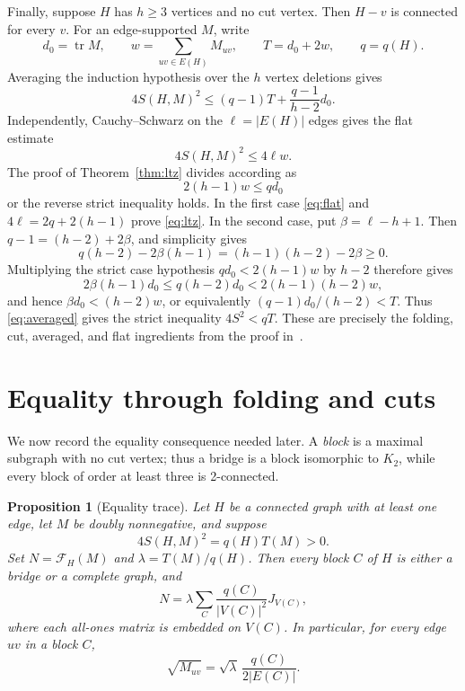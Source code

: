 \documentclass[11pt]{article}
\newtheorem{proposition}[theorem]{Proposition}
\theoremstyle{remark}
\newcommand{\tr}{\operatorname{tr}}
\begin{document}
Finally, suppose $H$ has $h\geq3$ vertices and no cut vertex.  Then $H-v$ is
connected for every $v$.  For an edge-supported $M$, write
\[
 d_0=\tr M,
 \qquad w=\sum_{uv\in E(H)}M_{uv},
 \qquad T=d_0+2w,
 \qquad q=q(H).
\]
Averaging the induction hypothesis over the $h$ vertex deletions gives
\begin{equation}\label{eq:averaged}
 4S(H,M)^2\leq(q-1)T+\frac{q-1}{h-2}d_0.
\end{equation}
Independently, Cauchy--Schwarz on the $\ell=|E(H)|$ edges gives the flat
estimate
\begin{equation}\label{eq:flat}
 4S(H,M)^2\leq4\ell w.
\end{equation}
The proof of Theorem~\ref{thm:ltz} divides according as
\begin{equation}\label{eq:threshold}
 2(h-1)w\leq qd_0
\end{equation}
or the reverse strict inequality holds.  In the first case
\eqref{eq:flat} and $4\ell=2q+2(h-1)$ prove \eqref{eq:ltz}.  In the second
case, put $\beta=\ell-h+1$.  Then $q-1=(h-2)+2\beta$, and simplicity gives
\[
 q(h-2)-2\beta(h-1)=(h-1)(h-2)-2\beta\geq0.
\]
Multiplying the strict case hypothesis $qd_0<2(h-1)w$ by $h-2$ therefore
gives
\[
 2\beta(h-1)d_0\leq q(h-2)d_0
 <2(h-1)(h-2)w,
\]
and hence $\beta d_0<(h-2)w$, or equivalently
$(q-1)d_0/(h-2)<T$.  Thus \eqref{eq:averaged} gives the strict inequality
$4S^2<qT$.  These are precisely the folding, cut, averaged, and flat
ingredients from the proof in~\cite{LTZ}.

\section{Equality through folding and cuts}\label{sec:equality}

We now record the equality consequence needed later.  A \emph{block} is a
maximal subgraph with no cut vertex; thus a bridge is a block isomorphic to
$K_2$, while every block of order at least three is 2-connected.

\begin{proposition}[Equality trace]\label{prop:trace}
Let $H$ be a connected graph with at least one edge, let $M$ be doubly
nonnegative, and suppose
\begin{equation}\label{eq:tight}
 4S(H,M)^2=q(H)T(M)>0.
\end{equation}
Set $N=\mathcal F_H(M)$ and $\lambda=T(M)/q(H)$.  Then every block $C$ of
$H$ is either a bridge or a complete graph, and
\begin{equation}\label{eq:block-atoms}
 N=\lambda\sum_C\frac{q(C)}{|V(C)|^2}J_{V(C)},
\end{equation}
where each all-ones matrix is embedded on $V(C)$.  In particular, for every
edge $uv$ in a block $C$,
\begin{equation}\label{eq:edge-root}
 \sqrt{M_{uv}}=\sqrt{\lambda}\,
 \frac{q(C)}{2|E(C)|}.
\end{equation}
\end{proposition}
\end{document}
